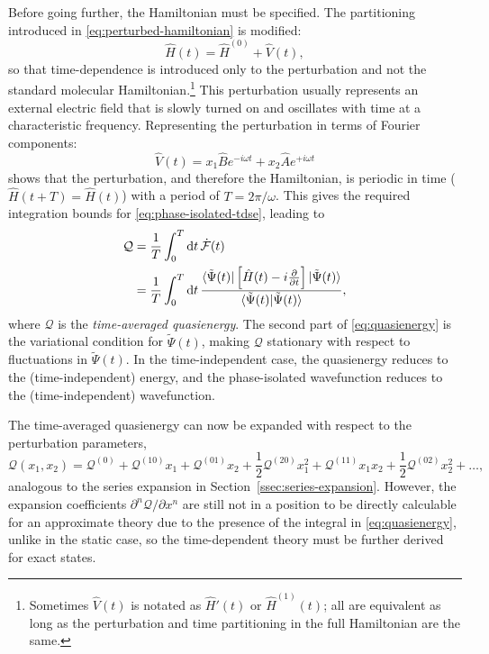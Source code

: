 \documentclass[%
class = book,%
crop = false,%
float = true,%
multi = true,%
preview = false,%
]{standalone}
\begin{document}
Before going further, the Hamiltonian must be specified. The partitioning introduced in \eqref{eq:perturbed-hamiltonian} is modified:
\begin{equation}
  \label{eq:perturbed-hamiltonian-time-dependent}
  \hat{H}(t) = \hat{H}^{(0)} + \hat{V}(t),
\end{equation}
so that time-dependence is introduced only to the perturbation and not the standard molecular Hamiltonian.\footnote{Sometimes \(\hat{V}(t)\) is notated as \(\hat{H}'(t)\) or \(\hat{H}^{(1)}(t)\); all are equivalent as long as the perturbation and time partitioning in the full Hamiltonian are the same.} This perturbation usually represents an external electric field that is slowly turned on and oscillates with time at a characteristic frequency. Representing the perturbation in terms of Fourier components:
\begin{equation}
  \label{eq:fourier-components}
  \hat{V}(t) = x_{1} \hat{B} e^{-i\omega t} + x_{2} \hat{A} e^{+i\omega t}
\end{equation} %
shows that the perturbation, and therefore the Hamiltonian, is periodic in time (\(\hat{H}(t + T) = \hat{H}(t)\)) with a period of \(T = 2\pi/\omega\). This gives the required integration bounds for \eqref{eq:phase-isolated-tdse}, leading to
\begin{equation}
  \label{eq:quasienergy}
  \begin{aligned}
    \mathcal{Q} &= \frac{1}{T} \int_{0}^{T} \mathrm{d}t \, \dot{\mathcal{F}}(t) \\
    &= \frac{1}{T} \int_{0}^{T} \mathrm{d}t \, \frac{\bra{\tilde{\Psi}(t)} \left[ \hat{H}(t) - i\frac{\partial}{\partial t} \right] \ket{\tilde{\Psi}(t)}}{\braket{\tilde{\Psi}(t)|\tilde{\Psi}(t)}},
  \end{aligned}
\end{equation}
where \(\mathcal{Q}\) is the \emph{time-averaged quasienergy}. The second part of \eqref{eq:quasienergy} is the variational condition for \(\tilde{\Psi}(t)\), making \(\mathcal{Q}\) stationary with respect to fluctuations in \(\tilde{\Psi}(t)\). In the time-independent case, the quasienergy reduces to the (time-independent) energy, and the phase-isolated wavefunction reduces to the (time-independent) wavefunction.

The time-averaged quasienergy can now be expanded with respect to the perturbation parameters,
\begin{equation}
  \label{eq:quasienergy-expansion}
  \mathcal{Q}(x_{1},x_{2}) = \mathcal{Q}^{(0)} + \mathcal{Q}^{(10)}x_{1} + \mathcal{Q}^{(01)}x_{2} + \frac{1}{2}\mathcal{Q}^{(20)}x_{1}^{2} + \mathcal{Q}^{(11)}x_{1}x_{2} + \frac{1}{2}\mathcal{Q}^{(02)}x_{2}^{2} + \dots,
\end{equation}
analogous to the series expansion in Section~\ref{ssec:series-expansion}. However, the expansion coefficients \(\partial^{n}\mathcal{Q}/\partial x^{n}\) are still not in a position to be directly calculable for an approximate theory due to the presence of the integral in \eqref{eq:quasienergy}, unlike in the static case, so the time-dependent theory must be further derived for exact states.
\end{document}
